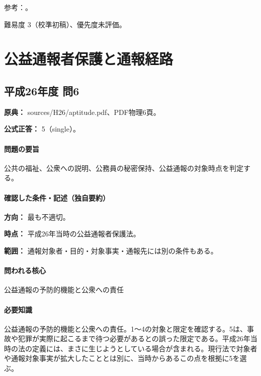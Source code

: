\par 参考：\cite{jisc_isoiec,jisc_certification,jisc_marks,meti_jis2019,mhlw_jis_history}。

\par 難易度 3（校準初稿）、優先度未評価。

\section{公益通報者保護と通報経路}

\subsection{平成26年度 問6}
\label{q:h26-reg-apt-06}

\noindent\textbf{原典：} sources/H26/aptitude.pdf、PDF物理6頁。

\textbf{公式正答：} 5（single）。

\paragraph{問題の要旨} 公共の福祉、公衆への説明、公務員の秘密保持、公益通報の対象時点を判定する。

\paragraph{確認した条件・記述（独自要約）}\mbox{}\par

\noindent\textbf{方向：} 最も不適切。\par

\noindent\textbf{時点：} 平成26年当時の公益通報者保護法。\par

\noindent\textbf{範囲：} 通報対象者・目的・対象事実・通報先には別の条件もある。\par

\paragraph{問われる核心} 公益通報の予防的機能と公衆への責任

\paragraph{必要知識} 公益通報の予防的機能と公衆への責任。1〜4の対象と限定を確認する。5は、事故や犯罪が実際に起こるまで待つ必要があるとの誤った限定である。平成26年当時の法の定義には、まさに生じようとしている場合が含まれる。現行法で対象者や通報対象事実が拡大したこととは別に、当時からあるこの点を根拠に5を選ぶ。

